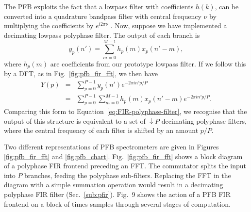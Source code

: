 \documentclass{ws-rv961x669}
\begin{document}
The PFB exploits the fact that a lowpass filter with coefficients $h(k)$, can be converted into a quadrature bandpass filter with central frequency $\nu$ by multiplying the coefficients by $e^{i 2\pi \nu}$ . 
Now, suppose we have implemented a decimating lowpass polyphase filter. The output of each branch is 
\begin{equation}
y_{p}(n')=\sum_{m=0}^{M-1}h_{p}(m)x_{p}(n'-m),
\end{equation}
where $h_{p}(m)$ are coefficients from our prototype lowpass filter. If we follow this by a DFT, as in Fig.~\ref{fig:pfb_fir_fft}, we then have 
\begin{eqnarray}
Y(p) & = & \sum_{p=0}^{P-1}y_{p}(n')e^{-2\pi in'p/P}\\
 & = & \sum_{p=0}^{P-1}\sum_{m=0}^{M-1}h_{p}(m)x_{p}(n'-m)e^{-2\pi in'p/P}.
\end{eqnarray}
Comparing this form to Equation~\ref{eq:FIR-polyphase-filter}, we recognise that the output
of this structure is equivalent to a set of $\downarrow P$ decimating polyphase filters,
where the central frequency of each filter is shifted by an amount $p/P$. 

Two different representations of PFB spectrometers are given in Figures \ref{fig:pfb_fir_fft} and \ref{fig:pfb_chart}. Fig.~\ref{fig:pfb_fir_fft} shows a block diagram of a polyphase FIR frontend preceding an FFT. The commutator splits the input into $P$ branches, feeding the polyphase sub-filters. Replacing the FFT in the diagram with a simple summation operation would result in a decimating polyphase FIR filter (Sec.~\ref{sub:pfir}). Fig.~9 shows the action of a PFB FIR frontend on a block of times samples through several stages of computation.
\end{document}
